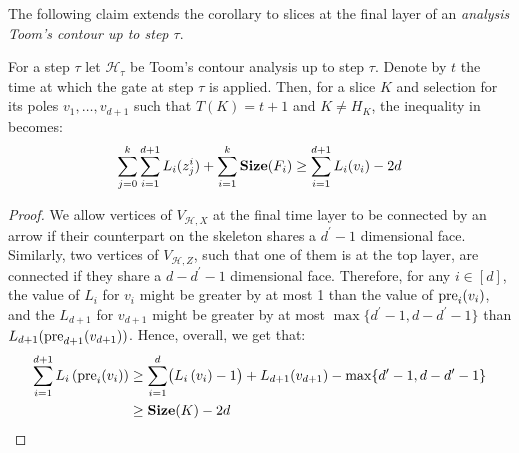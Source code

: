   
  The following claim extends the corollary to slices at the final layer of an \textit{analysis Toom's contour up to step $\tau$}. 
  \begin{claim}
    \label{claim:shrinkan}
For a step $\tau$  let $\mathcal{H}_{\tau}$ be Toom's contour analysis up to step $\tau$. Denote by $t$ the time at which the gate at step $\tau$ is applied. Then, for a slice $K$ and selection for its poles $v_{1}, \ldots, v_{d+1}$ such that $T(K) = t+1$ and $K \neq H_{K}$, the inequality in  becomes:
        \begin{equation*}
          \begin{split}
            \sum_{j=0}^{k}\sum_{i=1}^{d+1} L_{i}(z_{j}^{i}) +  \sum^{k}_{i=1}\mathbf{Size}(F_{i}) \ge \sum_{i=1}^{d+1}L_{i}(v_i) - 2d 
          \end{split}
        \end{equation*}
  \end{claim}
  \begin{proof}
    We allow vertices of $V_{\mathcal{H},X}$ at the final time layer to be connected by an arrow if their counterpart on the skeleton shares a $d^{\prime}-1$ dimensional face. Similarly, two vertices of $V_{\mathcal{H}, Z}$, such that one of them is at the top layer, are connected if they share a $d-d^{\prime}-1$ dimensional face. Therefore, for any $i \in [d]$, the value of $L_{i}$ for $v_{i}$ might be greater by at most 1 than the value of $\text{pre}_{i}(v_{i})$, and the $L_{d+1}$ for $v_{d+1}$ might be greater by at most $\max\{ d^{\prime} - 1, d - d^{\prime} - 1 \}$ than $L_{d+1}(\text{pre}_{d+1}(v_{d+1}))$. Hence, overall, we get that:
    \begin{equation*}
      \begin{split}
        \sum_{i=1}^{d+1}L_{i}\left( \text{pre}_{i}(v_{i}) \right) & \ge \sum_{i=1}^{d}\bigl( L_{i}\left( v_{i} \right) - 1 \bigr) + L_{d+1}(v_{d+1}) - \max\{ d^{\prime} - 1, d - d^{\prime}-1\}  \\ 
        & \ge  \mathbf{Size}(K) - 2d
      \end{split}
    \end{equation*}
  \end{proof}







